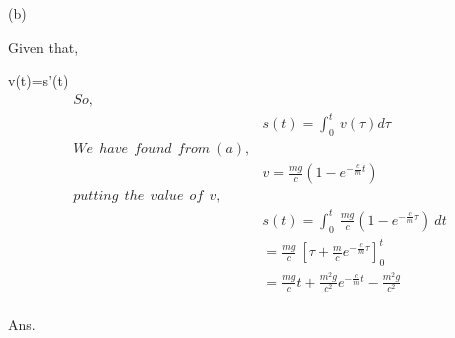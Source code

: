 \documentclass{article}
\begin{document}
\begin{homeworkProblem}
\newpage
\vspace{5mm}
\hspace{20mm}
\large
(b)
\par
\vspace{5mm}
\hspace{40mm}
Given that,
\par
\hspace{70mm}
v(t)=s'(t)
\begin{align*}
    So,\\
    &s(t)=\int_{0}^{t}\:v(\tau)d\tau\\
    We\:\:have\:\:found\:\:from \:(a),\\
    &v=\frac{mg}{c}(1-e^{-\frac{c}{m}t})\\
    putting\:\:the\:\:value\:\:of\:\:v,\\
    &s(t)=\int_{0}^{t}\:\frac{mg}{c}(1-e^{-\frac{c}{m}\tau})\:dt\\
    &= \frac{mg}{c}\:{[\tau+\frac{m}{c}e^{-\frac{c}{m}\tau}]}_{0}^{t}\\
    &=\frac{mg}{c}t+\frac{m^2 g}{c^2}e^{-\frac{c}{m}t}-\frac{m^2 g}{c^2}\\
\end{align*}
\par
\hspace{110mm}
\Large Ans.

\end{homeworkProblem}
\pagebreak



                
\end{document}
